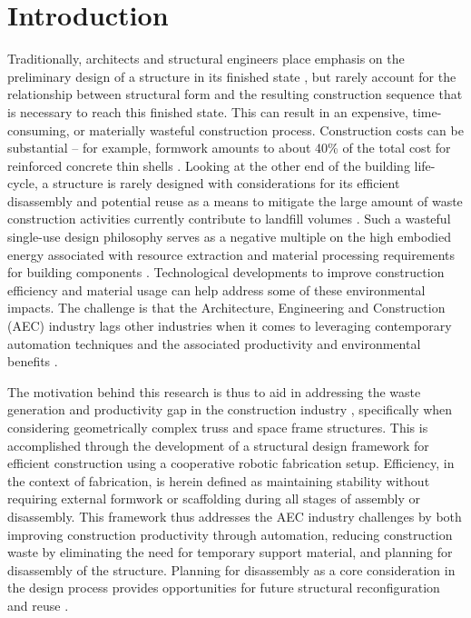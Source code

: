 \section{Introduction}\label{1_intro}
    Traditionally, architects and structural engineers place emphasis on the preliminary design of a structure in its finished state \citep{sharif_bim_2015}, but rarely account for the relationship between structural form and the resulting construction sequence that is necessary to reach this finished state. This can result in an expensive, time-consuming, or materially wasteful construction process. Construction costs can be substantial -- for example, formwork amounts to about 40\% of the total cost for reinforced concrete thin shells \citep{meyer_concrete_2005}. Looking at the other end of the building life-cycle, a structure is rarely designed with considerations for its efficient disassembly and potential reuse as a means to mitigate the large amount of waste construction activities currently contribute to landfill volumes \citep{zimmann_circular_2016}. Such a wasteful single-use design philosophy serves as a negative multiple on the high embodied energy associated with resource extraction and material processing requirements for building components \citep{kaethner_embodied_2012}. Technological developments to improve construction efficiency and material usage can help address some of these environmental impacts. The challenge is that the Architecture, Engineering and Construction (AEC) industry lags other industries when it comes to leveraging contemporary automation techniques and the associated productivity and environmental benefits \citep{barbosa_reinventing_2017}.
    
    The motivation behind this research is thus to aid in addressing the waste generation and productivity gap in the construction industry \citep{lu_framework_2011}, specifically when considering geometrically complex truss and space frame structures. This is accomplished through the development of a structural design framework for efficient construction using a cooperative robotic fabrication setup. Efficiency, in the context of fabrication, is herein defined as maintaining stability without requiring external formwork or scaffolding during all stages of assembly or disassembly. This framework thus addresses the AEC industry challenges by both improving construction productivity through automation, reducing construction waste by eliminating the need for temporary support material, and planning for disassembly of the structure. Planning for disassembly as a core consideration in the design process provides opportunities for future structural reconfiguration and reuse \citep{brutting_design_2019, brutting_optimum_2020, brutting_design_2021}.
    

